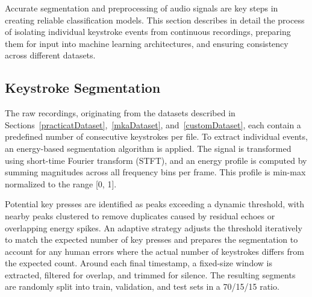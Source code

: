 \documentclass[a4paper,11pt,twoside]{report}
\theoremstyle{definition}
\begin{document}
Accurate segmentation and preprocessing of audio signals are key steps in creating reliable classification models. This section describes in detail the process of isolating individual keystroke events from continuous recordings, preparing them for input into machine learning architectures, and ensuring consistency across different datasets.

\subsection{Keystroke Segmentation}

The raw recordings, originating from the datasets described in Sections~\ref{practicatDataset},~\ref{mkaDataset}, and~\ref{customDataset}, each contain a predefined number of consecutive keystrokes per file. To extract individual events, an energy-based segmentation algorithm is applied. The signal is transformed using short-time Fourier transform (STFT), and an energy profile is computed by summing magnitudes across all frequency bins per frame. This profile is min-max normalized to the range [0, 1].

Potential key presses are identified as peaks exceeding a dynamic threshold, with nearby peaks clustered to remove duplicates caused by residual echoes or overlapping energy spikes. An adaptive strategy adjusts the threshold iteratively to match the expected number of key presses and prepares the segmentation to account for any human errors where the actual number of keystrokes differs from the expected count. Around each final timestamp, a fixed-size window is extracted, filtered for overlap, and trimmed for silence. The resulting segments are randomly split into train, validation, and test sets in a 70/15/15 ratio.
\end{document}

